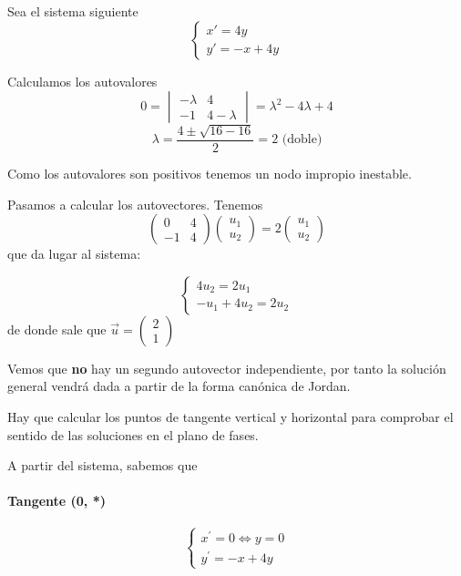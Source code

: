 \begin{example}
Sea el sistema siguiente
\begin{equation*}
\left\lbrace
\begin{array}{l}
	x' = 4y\\
	y'= -x+4y
\end{array}
\right.
\end{equation*}


Calculamos los autovalores
$$0 = \begin{vmatrix}
-\lambda & 4\\ -1& 4-\lambda
\end{vmatrix} = \lambda^2-4\lambda+4$$
$$\lambda = \frac{4\pm \sqrt{16-16}}{2} = 2\text{ (doble)}$$

Como los autovalores son positivos tenemos un nodo impropio inestable.

Pasamos a calcular los autovectores.
Tenemos
$$\begin{pmatrix}
0& 4\\-1& 4
\end{pmatrix}\begin{pmatrix}
u_1\\u_2
\end{pmatrix} = 2\begin{pmatrix}
u_1\\u_2
\end{pmatrix}$$
que da lugar al sistema:

\begin{equation*}
\left\lbrace
\begin{array}{l}
	4u_2 = 2u_1\\
	-u_1+4u_2 = 2u_2
\end{array}
\right.
\end{equation*}
de donde sale que $\vec{u}= \begin{pmatrix}
2\\1
\end{pmatrix}$

Vemos que \textbf{no} hay un segundo autovector independiente, por tanto la solución general vendrá dada a partir de la forma canónica de Jordan.

Hay que calcular los puntos de tangente vertical y horizontal para comprobar el sentido de las soluciones en el plano de fases.

A partir del sistema, sabemos que
\paragraph{Tangente (0, *)}
\begin{equation*}
\left\lbrace
\begin{array}{l}
	x^\prime = 0 \iff y=0\\
	y^\prime = -x+4y
\end{array}
\right.
\end{equation*}


\end{example}
